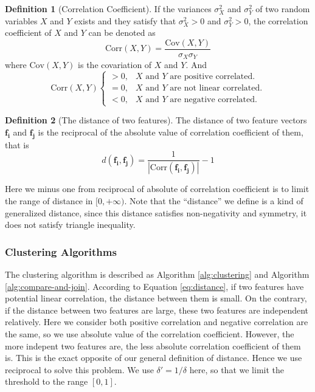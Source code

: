\documentclass{ieeeaccess}
\theoremstyle{definition}
\newtheorem{defn}{Definition}
\begin{document}
\begin{defn}[Correlation Coefficient]
    If the variances $\sigma^2_X$ and $\sigma_Y^2$ of two random variables $X$ and $Y$ exists and they satisfy that $\sigma^2_X > 0$ and $\sigma^2_Y > 0$, the correlation coefficient of $X$ and $Y$ can be denoted as
    \begin{equation}
        \text{Corr}(X, Y) = \frac{\text{Cov}(X, Y)}{\sigma_X \sigma_Y}
    \end{equation}
    where $\text{Cov}(X, Y)$ is the covariation of $X$ and $Y$. And
    $$\text{Corr}(X, Y) 
    \begin{cases}
    > 0, & X \text{ and } Y \text{ are positive correlated.}\\
    = 0, & X \text{ and } Y \text{ are not linear correlated.} \\
    < 0, & X \text{ and } Y \text{ are negative correlated.}
    \end{cases}$$
\end{defn}

\begin{defn}[The distance of two features]
    \label{def:distance}
    The distance of two feature vectors $\bm{f_i}$ and $\bm{f_j}$ is the reciprocal of the absolute value of correlation coefficient of them, that is
    \begin{equation}
        \label{eq:distance}
        d(\bm{f_i}, \bm{f_j}) = \frac{1}{|\text{Corr}(\bm{f_i}, \bm{f_j})|}-1
    \end{equation}
    \end{defn}

Here we minus one from reciprocal of absolute of correlation coefficient is to limit the range of distance in $[0, +\infty)$. Note that the ``distance'' we define is a kind of generalized distance, since this distance satisfies non-negativity and symmetry, it does not satisfy triangle inequality. 

\subsubsection{Clustering Algorithms}

The clustering algorithm is described as Algorithm \ref{alg:clustering} and Algorithm \ref{alg:compare-and-join}.
According to Equation \ref{eq:distance}, if two features have potential linear correlation, the distance between them is small. On the contrary, if the distance between two features are large, these two features are independent relatively. Here we consider both positive correlation and negative correlation are the same, so we use absolute value of the correlation coefficient. However, the more indepent two features are, the less absolute correlation coefficient of them is. This is the exact opposite of our general definition of distance. Hence we use reciprocal to solve this problem. We use $\delta' = 1/\delta$ here, so that we limit the threshold to the range $[0,1]$.
\end{document}
